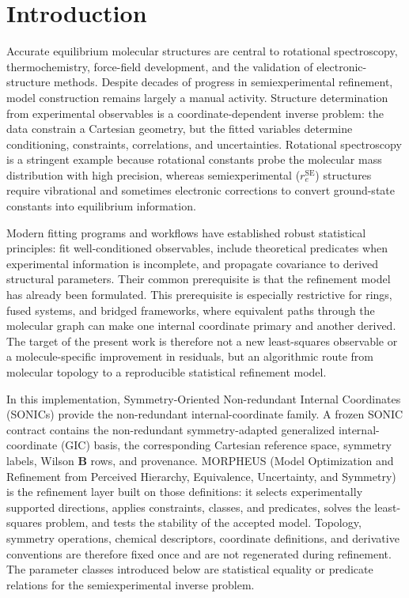 \documentclass[aip,jcp,reprint,longbibliography,floatfix]{revtex4-2}
\begin{document}
\maketitle


\section{Introduction}

Accurate equilibrium molecular structures are central to rotational
spectroscopy, thermochemistry, force-field development, and the validation of
electronic-structure methods.\cite{Demaison2011EquilibriumStructures,PuzzariniStanton2023}
Despite decades of progress in semiexperimental refinement, model construction
remains largely a manual activity. Structure determination from experimental
observables is a coordinate-dependent inverse problem: the data constrain a
Cartesian geometry, but the fitted variables determine conditioning,
constraints, correlations, and uncertainties. Rotational spectroscopy is a
stringent example because rotational constants probe the molecular mass
distribution with high precision, whereas semiexperimental
($r_e^{\mathrm{SE}}$) structures require vibrational and sometimes electronic
corrections to convert ground-state constants into equilibrium
information.\cite{Costain1958,Pawlowski2002,Piccardo2015B3LYP,Penocchio2015B2PLYP}

Modern fitting programs and workflows\cite{Mendolicchio2017MSR,KisielPROSPE,Kanzow2025PCCP}
have established robust statistical principles: fit well-conditioned
observables, include theoretical predicates when experimental information is
incomplete, and propagate covariance to derived structural
parameters.\cite{Bartell1975Predicate} Their common prerequisite is that the
refinement model has already been formulated. This prerequisite is especially
restrictive for rings, fused systems, and bridged frameworks, where equivalent
paths through the molecular graph can make one internal coordinate primary and
another derived. The target of the present work is therefore not a new
least-squares observable or a molecule-specific improvement in residuals, but
an algorithmic route from molecular topology to a reproducible statistical
refinement model.

In this implementation, Symmetry-Oriented Non-redundant Internal Coordinates
(SONICs) provide the non-redundant internal-coordinate family. A frozen SONIC
contract contains the non-redundant symmetry-adapted generalized
internal-coordinate (GIC) basis,
the corresponding Cartesian reference space, symmetry labels, Wilson
$\mathbf{B}$ rows, and provenance. MORPHEUS (Model Optimization and Refinement
from Perceived Hierarchy, Equivalence, Uncertainty, and Symmetry) is the
refinement layer built on those definitions: it selects experimentally supported directions,
applies constraints, classes, and predicates, solves the least-squares
problem, and tests the stability of the accepted model. Topology, symmetry
operations, chemical descriptors, coordinate definitions, and derivative
conventions are therefore fixed once and are not regenerated during
refinement. The parameter classes introduced below are statistical equality
or predicate relations for the semiexperimental inverse problem.
\end{document}
